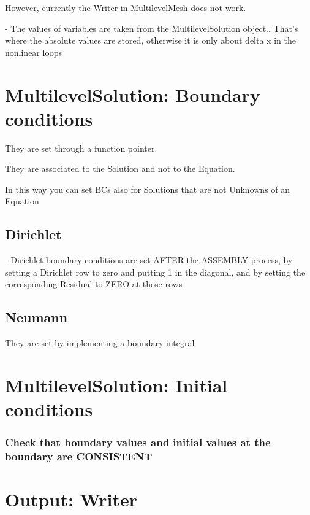 \documentclass[10pt]{book}
\begin{document}
   However, currently the Writer in MultilevelMesh does not work.
   

   - The values of variables are taken from the MultilevelSolution object..
     That's where the absolute values are stored, otherwise it is only about delta x in the nonlinear loops

     

     
  \section{MultilevelSolution: Boundary conditions}

  
  They are set through a function pointer.
  
  They are associated to the Solution and not to the Equation.
  
  In this way you can set BCs also for Solutions that are not Unknowns of an Equation

   \subsection{Dirichlet}
  
  -  Dirichlet boundary conditions are set AFTER the ASSEMBLY process,
     by setting a Dirichlet row to zero and putting 1 in the diagonal,
     and by setting the corresponding Residual to ZERO at those rows
  
   \subsection{Neumann}
   
    They are set by implementing a boundary integral
    
    
    
  
  
  \section{MultilevelSolution: Initial conditions}
  
  \subsubsection{Check that boundary values and initial values at the boundary are CONSISTENT}

  
  \section{Output: Writer}
\end{document}
